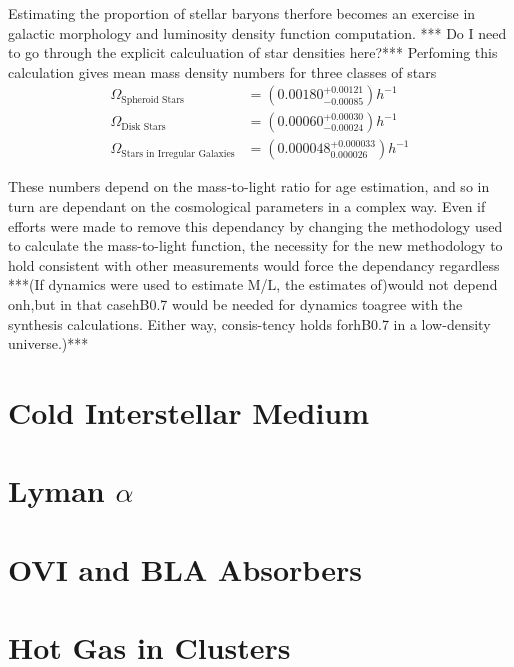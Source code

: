 \par Estimating the proportion of stellar baryons therfore becomes an exercise in galactic morphology and luminosity density function computation. *** Do I need to go through the explicit calculuation of star densities here?*** Perfoming this calculation gives mean mass density numbers for three classes of stars
\begin{align*}
\Omega_{\text{Spheroid Stars}} &= (0.00180^{+0.00121}_{-0.00085}) h^{-1} \\
\Omega_{\text{Disk Stars}} &= (0.00060^{+0.00030}_{-0.00024}) h^{-1} \\
\Omega_{\text{Stars in Irregular Galaxies}} &= (0.000048^{+0.000033}_{0.000026}) h^{-1}
\end{align*}

These numbers depend on the mass-to-light ratio for age estimation, and so in turn are dependant on the cosmological parameters in a complex way. Even if efforts were made to remove this dependancy by changing the methodology used to calculate the mass-to-light function, the necessity for the new methodology to hold consistent with other measurements would force the dependancy regardless ***(If dynamics were used to estimate M/L, the estimates of)would not depend onh,but in that casehB0.7 would be needed for dynamics toagree with the synthesis calculations. Either way, consis-tency holds forhB0.7 in a low-density universe.)***

\section{Cold Interstellar Medium}



\section{Lyman $\alpha$}
\section{OVI and BLA Absorbers}
\section{Hot Gas in Clusters}

